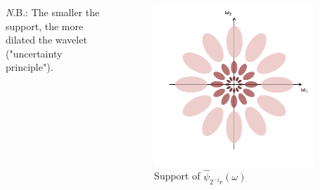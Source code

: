 \documentclass[10pt]{beamer}
\begin{document}
\begin{darkframes}
\begin{frame}[label=fourier]{\subsecname}
\begin{columns}
            {\emph N.B.: The smaller the support, the more dilated the wavelet ("uncertainty principle").}
            \begin{figure}
            \centering
            \includegraphics[width=0.9\textwidth]{resources/wavelets/Fourier_domain.png}
            \caption{Support of $\widehat{\psi}_{2^{-j}r}(\omega)$}
            \end{figure}
    \end{columns}
    \end{frame}
    

\end{darkframes}
\end{document}
